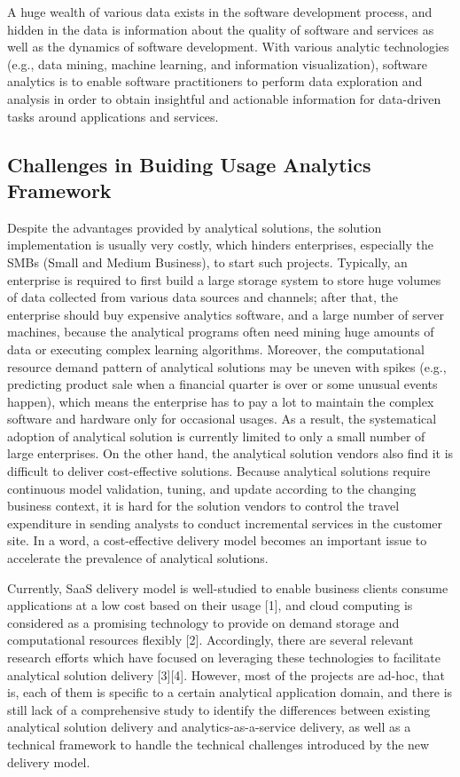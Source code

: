 A huge wealth of various data exists in the software development process, and hidden in the data is information about the quality of software and services as well as the dynamics of software development. With various analytic technologies (e.g., data mining, machine learning, and information visualization), software analytics is to enable software practitioners
to perform data exploration and analysis in order to obtain insightful and actionable information for data-driven tasks around applications and services.

\subsection{Challenges in Buiding Usage Analytics Framework}

Despite the advantages provided by analytical solutions, the solution implementation is usually very costly, which hinders enterprises, especially the SMBs (Small and Medium Business), to start such projects. Typically, an enterprise is required to first build a large storage system to store huge volumes of data collected from various data sources and channels; after that, the enterprise should buy expensive analytics software, and a large number of server machines, because the analytical programs often need mining huge amounts of data or executing complex learning algorithms. Moreover, the computational resource demand pattern of analytical solutions may be uneven with spikes (e.g., predicting product sale when a financial quarter is over or some unusual events happen), which means the enterprise has to pay a lot to maintain the complex software and hardware only for occasional usages. As a result, the systematical adoption of analytical
solution is currently limited to only a small number of large enterprises. On the other hand, the analytical solution vendors also find it is difficult to deliver cost-effective solutions. Because analytical solutions require continuous model validation,
tuning, and update according to the changing business context, it is hard for the solution vendors to control the
travel expenditure in sending analysts to conduct incremental services in the customer site. In a word, a cost-effective delivery model becomes an important issue to accelerate the prevalence of analytical solutions. 

Currently, SaaS delivery model is well-studied to enable business clients consume applications at a low cost based on their usage [1], and cloud computing is considered as a promising technology to provide on demand storage and computational resources flexibly [2]. Accordingly, there are several relevant research efforts which have focused on
leveraging these technologies to facilitate analytical solution delivery [3][4]. However, most of the projects are ad-hoc, that is, each of them is specific to a certain analytical application domain, and there is still lack of a comprehensive study to identify the differences between existing analytical solution delivery and analytics-as-a-service delivery, as well as a technical framework to handle the technical challenges introduced by the new delivery model.

